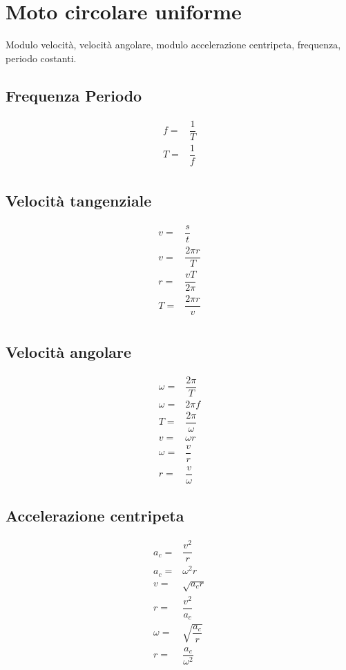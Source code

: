 \chapter{Moto circolare uniforme}
\begin{center}
	
\end{center}
Modulo velocità, velocità angolare, modulo accelerazione centripeta, frequenza, periodo costanti. 
\section{Frequenza Periodo}
\begin{align*}
f=&\dfrac{1}{T}\\
T=&\dfrac{1}{f}\\
\end{align*}
\section{Velocità tangenziale}
\begin{align*}
v=&\dfrac{s}{t}\\
v=&\dfrac{2\pi r}{T}\\
r=&\dfrac{vT}{2\pi}\\
T=&\dfrac{2\pi r}{v}\\
\end{align*}
\section{Velocità angolare}
\begin{align*}
\omega=&\dfrac{2\pi}{T}\\
\omega=&2\pi f\\
T=&\dfrac{2\pi}{\omega}\\
v=&\omega r\\
\omega=&\dfrac{v}{r}\\
r=&\dfrac{v}{\omega}
\end{align*}
\section{Accelerazione centripeta}
\begin{align*}
a_c=&\dfrac{v^2}{r}\\
a_c=&\omega^2 r\\
v=&\sqrt{a_c r}\\
r=&\dfrac{v^2}{a_c}\\
\omega=&\sqrt{\dfrac{a_c}{r}}\\
r=&\dfrac{a_c}{\omega^2}
\end{align*}
